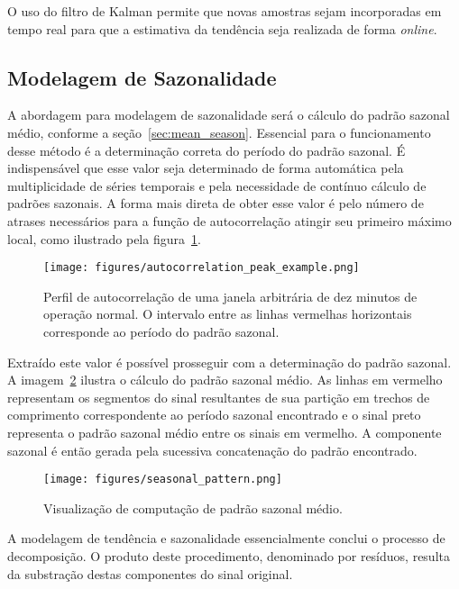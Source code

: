 O uso do filtro de Kalman permite que novas amostras sejam incorporadas em
tempo real para que a estimativa da tendência seja realizada de forma
\emph{online}.

\subsection{Modelagem de Sazonalidade}

A abordagem para modelagem de sazonalidade será o cálculo do padrão sazonal
médio, conforme a seção~\ref{sec:mean_season}. Essencial para o funcionamento
desse método é a determinação correta do período do padrão sazonal. É
indispensável que esse valor seja determinado de forma automática pela
multiplicidade de séries temporais e pela necessidade de contínuo cálculo de
padrões sazonais. A forma mais direta de obter esse valor é pelo número de
atrases necessários para a função de autocorrelação atingir seu primeiro
máximo local, como ilustrado pela figura~\ref{fig:acorr_peak}.

\begin{figure}[H]
    \centering
    \texttt{[image: figures/autocorrelation\_peak\_example.png]}
    \caption{Perfil de autocorrelação de uma janela arbitrária de dez minutos
    de operação normal. O intervalo entre as linhas vermelhas horizontais
    corresponde ao período do padrão sazonal.}
    \label{fig:acorr_peak}
\end{figure}

Extraído este valor é possível prosseguir com a determinação do padrão sazonal.
A imagem~\ref{fig:mean_seasonal_pattern} ilustra o cálculo do padrão sazonal
médio. As linhas em vermelho representam os segmentos do sinal resultantes de
sua partição em trechos de comprimento correspondente ao período sazonal
encontrado e o sinal preto representa o padrão sazonal médio entre os sinais em
vermelho. A componente sazonal é então gerada pela sucessiva concatenação do
padrão encontrado.

\begin{figure}[H]
    \centering
    \texttt{[image: figures/seasonal\_pattern.png]}
    \caption{Visualização de computação de padrão sazonal médio.}
    \label{fig:mean_seasonal_pattern}
\end{figure}

A modelagem de tendência e sazonalidade essencialmente conclui o processo de
decomposição. O produto deste procedimento, denominado por resíduos, resulta da
substração destas componentes do sinal original.

